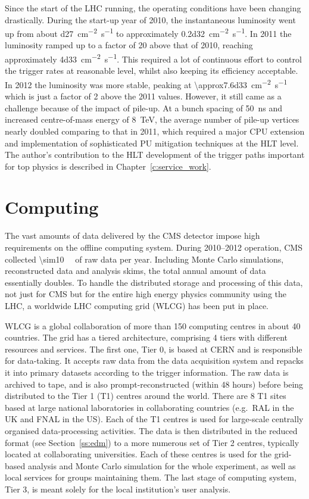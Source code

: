 Since the start of the LHC running, the operating conditions have been changing drastically. During the start-up year of
2010, the instantaneous luminosity went up from about \SI{d27}{\cm^{-2} s^{-1}} to approximately \SI{0.2d32}{\cm^{-2}
s^{-1}}. In 2011 the luminosity ramped up to a factor of \num{20} above that of 2010, reaching approximately
\SI{4d33}{\cm^{-2} s^{-1}}. This required a lot of continuous effort to control the trigger rates at reasonable level,
whilst also keeping its efficiency acceptable. In 2012 the luminosity was more stable, peaking at
\SI{\approx7.6d33}{\cm^{-2} s^{-1}} which is just a factor of 2 above the 2011 values. However, it still came as a
challenge because of the impact of pile-up. At a bunch spacing of \SI{50}{\ns} and increased centre-of-mass energy of
\SI{8}{\TeV}, the average number of pile-up vertices nearly doubled comparing to that in 2011, which required a major
CPU extension and implementation of sophisticated PU mitigation techniques at the HLT level. The author's contribution
to the HLT development of the trigger paths important for top physics is described in Chapter~\ref{c:service_work}.

\section{Computing}
\label{s:computing}
The vast amounts of data delivered by the CMS detector impose high requirements on the offline computing system. During
2010--2012 operation, CMS collected \SI{\sim10}{\peta\byte} of raw data per year. Including Monte Carlo simulations,
reconstructed data and analysis skims, the total annual amount of data essentially doubles. To handle the distributed
storage and processing of this data, not just for CMS but for the entire high energy physics community using the LHC, a
worldwide LHC computing grid (WLCG) has been put in place.

WLCG is a global collaboration of more than 150 computing centres in about 40 countries. The grid has a tiered
architecture, comprising 4 tiers with different resources and services. The first one, Tier 0, is based at CERN and is
responsible for data-taking. It accepts raw data from the data acquisition system and repacks it into primary datasets
according to the trigger information. The raw data is archived to tape, and is also prompt-reconstructed (within 48
hours) before being distributed to the Tier 1 (T1) centres around the world. There are 8 T1 sites based at large
national laboratories in collaborating countries (e.g.\ RAL in the UK and FNAL in the US). Each of the T1 centres is
used for large-scale centrally organised data-processing activities. The data is then distributed in the reduced format
(see Section~\ref{ss:edm}) to a more numerous set of Tier 2 centres, typically located at collaborating universities.
Each of these centres is used for the grid-based analysis and Monte Carlo simulation for the whole experiment, as well
as local services for groups maintaining them. The last stage of computing system, Tier 3, is meant solely for the local
institution's user analysis.

